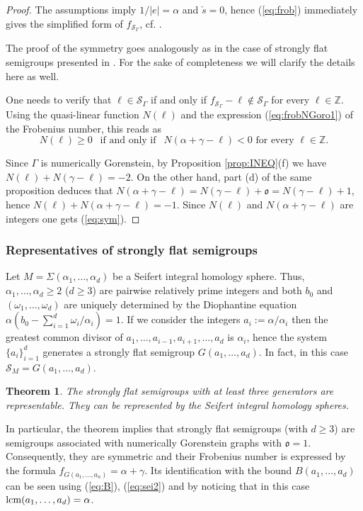 \documentclass[oneside]{amsart}
\numberwithin{equation}{section}
\numberwithin{equation}{subsection}
\theoremstyle{plain}
\newtheorem{thm}[equation]{Theorem}
\theoremstyle{definition}
\def\Z{\mathbb Z}
\newcommand{\calS}{{\mathcal S}}\newcommand{\cals}{{\bf s}}\newcommand{\calst}{{\bf st}}\newcommand{\cS}{{\mathcal S}}
\newcommand{\al}{\alpha}
\renewcommand{\Z}{\mathbb{Z}}
\newcommand{\G}{\Gamma}
\newcommand{\oo}{\mathfrak{o}}
\begin{document}
\begin{proof}
The assumptions imply $1/|e|=\alpha$ and $\check{s}=0$, hence (\ref{eq:frob}) immediately gives the simplified form of $f_{\calS_{\Gamma}}$, cf. \cite[Corollary 3.2.12 or Example 6.2.4(1)]{stronglyflat}.
\vspace{0.1cm}

The proof of the symmetry goes analogously as in the case of strongly flat semigroups presented in \cite[4.1.1]{stronglyflat}. For the sake of completeness we will clarify the details here as well.

One needs to verify  that $\ell\in \calS_\Gamma$ if and only if $f_{\calS_\Gamma}-\ell\not\in\calS_\Gamma$ for
    every $\ell\in\Z.$ Using the quasi-linear function $N(\ell)$ and the expression (\ref{eq:frobNGoro1}) of the Frobenius number, this reads as 
\begin{equation}\label{eq:sym}
    N(\ell)\ge 0 \ \ \mbox{ if and only if } \ \ N(\al+\gamma-\ell)<0 
    \mbox{ for every } \ell\in\Z.     
\end{equation}
   
 Since $\G$ is numerically Gorenstein,  by Proposition \ref{prop:INEQ}(f) we have  $N(\ell)+N(\gamma-\ell)=-2$. On the other hand, part (d) of the same proposition deduces that $N(\al+\gamma-\ell)=N(\gamma-\ell)+\oo=N(\gamma-\ell)+1$,  hence  $N(\ell)+N(\al+\gamma-\ell)=-1$. Since $N(\ell)$ and $N(\al+\gamma-\ell)$ are integers one gets   (\ref{eq:sym}).
\end{proof}

\subsubsection{\bf Representatives of strongly flat semigroups}

Let  $M=\Sigma(\alpha_1,\dots,\alpha_d)$ be a Seifert integral homology sphere. Thus, $\alpha_1,\ldots,\alpha_d \geq 2$ ($d\geq 3$) are pairwise relatively prime integers and both $b_0$ and $(\omega_1,\ldots,\omega_d)$ are uniquely determined by the Diophantine equation $\alpha(b_0-\sum_{i=1}^d\omega_i/\alpha_i)=1$. If we consider the integers  $a_i:=\alpha/\alpha_i$
then the greatest common divisor of $a_1, \ldots, a_{i-1}, a_{i+1},\ldots, a_d$
 is $\alpha_i$, hence the system $\{a_i\}_{i=1}^d$ generates a strongly flat semigroup
 $G(a_1, \ldots, a_d)$. In fact, in this case $\mathcal{S}_M=G(a_1, \ldots, a_d)$.


\begin{thm}{\cite{stronglyflat}}\label{thm:Sgen}
The strongly flat semigroups with at least three generators are representable. They can be represented by the Seifert integral homology spheres.
\end{thm}
In particular, the theorem implies that strongly flat semigroups (with $d\geq 3$) are semigroups associated with numerically Gorenstein graphs with $\oo=1$. Consequently, they are symmetric and their Frobenius number is expressed by the formula $ f_{G(a_1,\ldots,a_n)}=\alpha+\gamma$. Its identification  with the bound  $B(a_1,\dots, a_d)$ can be seen using  (\ref{eq:B}), (\ref{eq:sei2}) and by noticing that in this case ${\rm lcm}(a_1,\ldots, a_d)=\alpha$.
\end{document}
